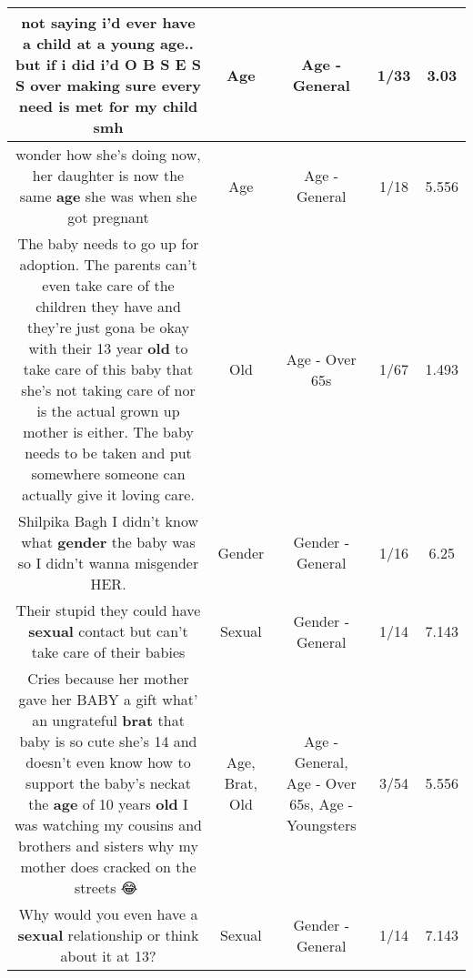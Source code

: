 \documentclass[11pt]{article}
\newlength\mylength
\begin{document}
\begin{center}
\begin{longtable}{|C{.65\mylength}|C{.30\mylength}|C{.12\mylength}|C{.12\mylength}|C{.12\mylength}|}
  \small not saying i'd ever have a child at a young \textbf{age}.. but if i did i'd O B S E S S over making sure every need is met for my child smh\normalsize   & Age & Age - General & 1/33 & 3.03 \\  \hline
  \small wonder how she's doing now, her daughter is now the same \textbf{age} she was when she got pregnant\normalsize   & Age & Age - General & 1/18 & 5.556 \\  \hline
  \small The baby needs to go up for adoption. The parents can't even take care of the children they have and they're just gona be okay with their 13 year \textbf{old} to take care of this baby that she's not taking care of nor is the actual grown up mother is either. The baby needs to be taken and put somewhere someone can actually give it loving care.\normalsize   & Old & Age - Over 65s & 1/67 & 1.493 \\  \hline
  \small Shilpika Bagh I didn't know what \textbf{gender} the baby was so I didn't wanna misgender HER.\normalsize   & Gender & Gender - General & 1/16 & 6.25 \\  \hline
  \small Their stupid they could have \textbf{sexual} contact but can't take care of their babies\normalsize   & Sexual & Gender - General & 1/14 & 7.143 \\  \hline
  \small Cries because her mother gave her BABY  a gift what' an ungrateful \textbf{brat} that baby is so cute she's 14 and doesn't even know how to support the baby's neckat the \textbf{age} of 10 years \textbf{old} I was watching my cousins and brothers and sisters why my mother does cracked on the streets 😂📿\normalsize   & Age, Brat, Old & Age - General, Age - Over 65s, Age - Youngsters & 3/54 & 5.556 \\  \hline
  \small Why would you even have a \textbf{sexual} relationship or think about it at 13?\normalsize   & Sexual & Gender - General & 1/14 & 7.143 \\  \hline

\end{longtable}
\end{center}
\end{document}
